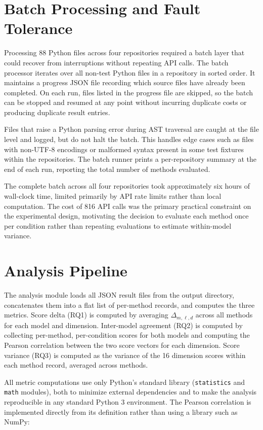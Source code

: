 \documentclass[12pt]{report}
\begin{document}
\section{Batch Processing and Fault Tolerance}

Processing 88 Python files across four repositories required a batch layer that could recover from interruptions without repeating API calls. The batch processor iterates over all non-test Python files in a repository in sorted order. It maintains a progress JSON file recording which source files have already been completed. On each run, files listed in the progress file are skipped, so the batch can be stopped and resumed at any point without incurring duplicate costs or producing duplicate result entries.

Files that raise a Python parsing error during AST traversal are caught at the file level and logged, but do not halt the batch. This handles edge cases such as files with non-UTF-8 encodings or malformed syntax present in some test fixtures within the repositories. The batch runner prints a per-repository summary at the end of each run, reporting the total number of methods evaluated.

The complete batch across all four repositories took approximately six hours of wall-clock time, limited primarily by API rate limits rather than local computation. The cost of 816 API calls was the primary practical constraint on the experimental design, motivating the decision to evaluate each method once per condition rather than repeating evaluations to estimate within-model variance.

\section{Analysis Pipeline}

The analysis module loads all JSON result files from the output directory, concatenates them into a flat list of per-method records, and computes the three metrics. Score delta (RQ1) is computed by averaging $\Delta_{m,\ell,d}$ across all methods for each model and dimension. Inter-model agreement (RQ2) is computed by collecting per-method, per-condition scores for both models and computing the Pearson correlation between the two score vectors for each dimension. Score variance (RQ3) is computed as the variance of the 16 dimension scores within each method record, averaged across methods.

All metric computations use only Python's standard library (\texttt{statistics} and \texttt{math} modules), both to minimize external dependencies and to make the analysis reproducible in any standard Python 3 environment. The Pearson correlation is implemented directly from its definition rather than using a library such as NumPy:
\end{document}
